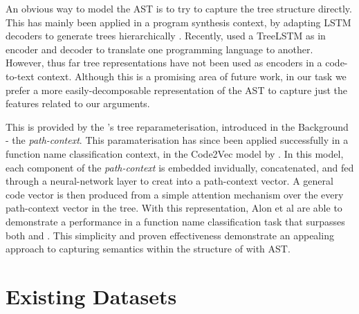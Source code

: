 An obvious way to model the AST is to try to capture the tree structure directly. This has mainly been applied in a program synthesis context, by adapting LSTM decoders to generate trees hierarchically \citep{dong_language_2016,yin_syntactic_2017}. Recently, \citet{chen_tree--tree_2018} used a TreeLSTM  \citep{tai_improved_2015} as in encoder and decoder to translate one programming language to another. However, thus far tree representations have not been used as encoders in a code-to-text context. Although this is a promising area of future work, in our task we prefer a more easily-decomposable representation of the AST to capture just the features related to our arguments.

This is provided by the \citet{alon_general_2018}'s tree reparameterisation, introduced in the Background - the \textit{path-context}.
This paramaterisation has since been applied successfully in a function name classification context, in the Code2Vec model by \citep{alon_code2vec_2018}.
In this model, each component of the \textit{path-context} is embedded invidually, concatenated, and fed through a neural-network layer to creat into a path-context vector.
A general code vector is then produced from a simple attention mechanism over the every path-context vector in the tree. 
With this representation, Alon et al are able to demonstrate a performance in a function name classification task that surpasses both \citet{allamanis_convolutional_2016} and \citet{iyer_summarizing_2016}. This simplicity and proven effectiveness demonstrate an appealing approach to capturing semantics within the structure of with AST.

\section{Existing Datasets}
\label{sec:existing_datasets}

